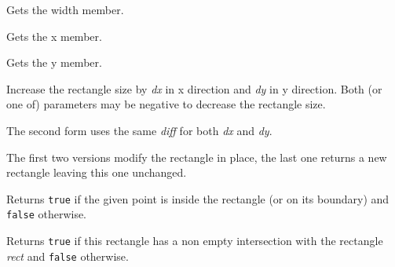 \label{wxrectgetwidth}


Gets the width member.

\label{wxrectgetx}


Gets the x member.

\label{wxrectgety}


Gets the y member.

\label{wxrectinflate}




Increase the rectangle size by {\it dx} in x direction and {\it dy} in y
direction. Both (or one of) parameters may be negative to decrease the
rectangle size.

The second form uses the same {\it diff} for both {\it dx} and {\it dy}.

The first two versions modify the rectangle in place, the last one returns a
new rectangle leaving this one unchanged.



\label{wxrectinside}



Returns {\tt true} if the given point is inside the rectangle (or on its
boundary) and {\tt false} otherwise.

\label{wxrectintersects}


Returns {\tt true} if this rectangle has a non empty intersection with the
rectangle {\it rect} and {\tt false} otherwise.

\label{wxrectalignin}


